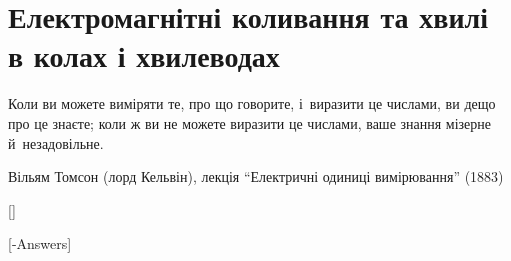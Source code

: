 \documentclass[biblatex]{ConspectBook}
\begin{document}
\part{Електромагнітні коливання та хвилі в колах і хвилеводах}
\label{part:EMOscillationsAndWaveguides}
\gdef\currentparttitle{Коливання та хвилі в колах і хвилеводах}
\epigraph{\Alexander Коли ви можете виміряти те, про що говорите, і~виразити це числами, ви дещо про це знаєте; коли ж ви не можете виразити це числами, ваше знання мізерне й~незадовільне.}{Вільям Томсон (лорд Кельвін), лекція \enquote{Електричні одиниці вимірювання} (1883)}
[]

%
%
\answers
{}[-Answers]
%
%
\appendix




%
%
\clearpage\bibliographytrue{}\label{BibPage}
\pagestyle{bibliography}

\nocite{%
	ZhdanovElectro1,
	ZhdanovElectro2,
	ParnovskyElectro,
	Ponomarenko,
    FLP2,
    Fedorchenko1992,
    Suhakov1975,
    purcell2013electricity,
}

\printbibliographies

\clearpage\pagestyle{index}
\printindex

\makelastpage
\end{document}

